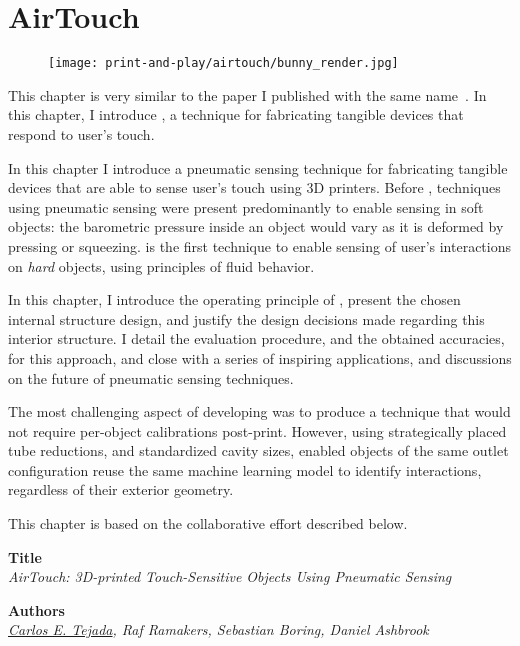 	\chapter{AirTouch} \label{ch:airtouch}
	\begin{figure}[h]
		\centering
		\texttt{[image: print-and-play/airtouch/bunny\_render.jpg]}
	\end{figure}

	This chapter is very similar to the paper I published with the same
	name~\cite{Tejada:2020}. In this chapter, I introduce \at, a technique for
	fabricating tangible devices that respond to user's touch.

	In this chapter I introduce a pneumatic sensing technique for fabricating
	tangible devices that are able to sense user's touch using 3D printers. Before
	\at, techniques using pneumatic sensing were present predominantly to enable
	sensing in soft objects: the barometric pressure inside an object would vary
	as it is deformed by pressing or squeezing. \at is the first technique to
	enable sensing of user's interactions on \emph{hard} objects, using principles
	of fluid behavior.

	In this chapter, I introduce the operating principle of \at, present the
	chosen internal structure design, and justify the design decisions made
	regarding this interior structure. I detail the evaluation procedure, and the
	obtained accuracies, for this approach, and close with a series of inspiring
	applications, and discussions on the future of pneumatic sensing techniques.

	The most challenging aspect of developing \at was to produce a technique that
	would not require per-object calibrations post-print. However, using
	strategically placed tube reductions, and standardized cavity sizes, enabled
	\at objects of the same outlet configuration reuse the same machine learning
	model to identify interactions, regardless of their exterior geometry.

	\vfill

	\newpage

	This chapter is based on the collaborative effort described below.

	\vfill

	\noindent
	\textbf{Title}\\
	\textit{AirTouch: 3D-printed Touch-Sensitive Objects Using Pneumatic Sensing}

	\bigskip

	\noindent
	\textbf{Authors}\\
	\textit{\underline{Carlos E. Tejada}, Raf Ramakers, Sebastian Boring, Daniel Ashbrook}

